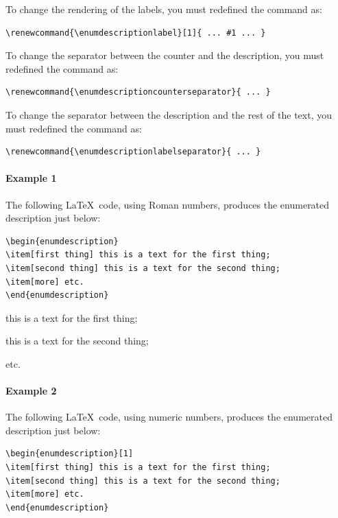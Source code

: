 \documentclass[book,taskpackage,specpackage,codepackage]{upmethodology-document}
\begin{document}
To change the rendering of the labels, you must redefined the command as:
\begin{verbatim}
\renewcommand{\enumdescriptionlabel}[1]{ ... #1 ... }
\end{verbatim}

To change the separator between the counter and the description, you must redefined the command as:
\begin{verbatim}
\renewcommand{\enumdescriptioncounterseparator}{ ... }
\end{verbatim}

To change the separator between the description and the rest of the text, you must redefined the command as:
\begin{verbatim}
\renewcommand{\enumdescriptionlabelseparator}{ ... }
\end{verbatim}

\paragraph{Example 1} The following \LaTeX~code, using Roman numbers, produces the enumerated description just below:
\begin{verbatim}
\begin{enumdescription}
\item[first thing] this is a text for the first thing;
\item[second thing] this is a text for the second thing;
\item[more] etc.
\end{enumdescription}
\end{verbatim}

\begin{enumdescription}
\item[first thing] this is a text for the first thing;
\item[second thing] this is a text for the second thing;
\item[more] etc.
\end{enumdescription}

\paragraph{Example 2} The following \LaTeX~code, using numeric numbers, produces the enumerated description just below:
\begin{verbatim}
\begin{enumdescription}[1]
\item[first thing] this is a text for the first thing;
\item[second thing] this is a text for the second thing;
\item[more] etc.
\end{enumdescription}
\end{verbatim}
\end{document}
